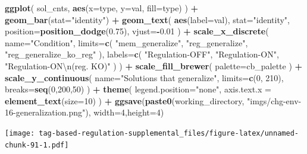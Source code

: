 \documentclass[]{book}
\newenvironment{Shaded}{\begin{snugshade}}{\end{snugshade}}
\newcommand{\CharTok}[1]{\textcolor[rgb]{0.31,0.60,0.02}{#1}}
\newcommand{\DataTypeTok}[1]{\textcolor[rgb]{0.13,0.29,0.53}{#1}}
\newcommand{\DecValTok}[1]{\textcolor[rgb]{0.00,0.00,0.81}{#1}}
\newcommand{\FloatTok}[1]{\textcolor[rgb]{0.00,0.00,0.81}{#1}}
\newcommand{\KeywordTok}[1]{\textcolor[rgb]{0.13,0.29,0.53}{\textbf{#1}}}
\newcommand{\NormalTok}[1]{#1}
\newcommand{\OperatorTok}[1]{\textcolor[rgb]{0.81,0.36,0.00}{\textbf{#1}}}
\newcommand{\StringTok}[1]{\textcolor[rgb]{0.31,0.60,0.02}{#1}}
\begin{document}
\begin{Shaded}
\begin{Highlighting}[]
\KeywordTok{ggplot}\NormalTok{( sol_cnts, }\KeywordTok{aes}\NormalTok{(}\DataTypeTok{x=}\NormalTok{type, }\DataTypeTok{y=}\NormalTok{val, }\DataTypeTok{fill=}\NormalTok{type) ) }\OperatorTok{+}
\StringTok{  }\KeywordTok{geom_bar}\NormalTok{(}\DataTypeTok{stat=}\StringTok{"identity"}\NormalTok{) }\OperatorTok{+}
\StringTok{  }\KeywordTok{geom_text}\NormalTok{(}
    \KeywordTok{aes}\NormalTok{(}\DataTypeTok{label=}\NormalTok{val),}
    \DataTypeTok{stat=}\StringTok{"identity"}\NormalTok{,}
    \DataTypeTok{position=}\KeywordTok{position_dodge}\NormalTok{(}\FloatTok{0.75}\NormalTok{),}
    \DataTypeTok{vjust=}\OperatorTok{-}\FloatTok{0.01}
\NormalTok{  ) }\OperatorTok{+}
\StringTok{  }\KeywordTok{scale_x_discrete}\NormalTok{(}
    \DataTypeTok{name=}\StringTok{"Condition"}\NormalTok{,}
    \DataTypeTok{limits=}\KeywordTok{c}\NormalTok{(}
      \StringTok{"mem_generalize"}\NormalTok{,}
      \StringTok{"reg_generalize"}\NormalTok{,}
      \StringTok{"reg_generalize_ko_reg"}
\NormalTok{      ),}
    \DataTypeTok{labels=}\KeywordTok{c}\NormalTok{(}
      \StringTok{"Regulation-OFF"}\NormalTok{,}
      \StringTok{"Regulation-ON"}\NormalTok{,}
      \StringTok{"Regulation-ON}\CharTok{\textbackslash{}n}\StringTok{(reg. KO)"}
\NormalTok{    )}
\NormalTok{  ) }\OperatorTok{+}
\StringTok{  }\KeywordTok{scale_fill_brewer}\NormalTok{(}
    \DataTypeTok{palette=}\NormalTok{cb_palette}
\NormalTok{  ) }\OperatorTok{+}
\StringTok{  }\KeywordTok{scale_y_continuous}\NormalTok{(}
    \DataTypeTok{name=}\StringTok{"Solutions that generalize"}\NormalTok{,}
    \DataTypeTok{limits=}\KeywordTok{c}\NormalTok{(}\DecValTok{0}\NormalTok{, }\DecValTok{210}\NormalTok{),}
    \DataTypeTok{breaks=}\KeywordTok{seq}\NormalTok{(}\DecValTok{0}\NormalTok{,}\DecValTok{200}\NormalTok{,}\DecValTok{50}\NormalTok{)}
\NormalTok{  ) }\OperatorTok{+}
\StringTok{  }\KeywordTok{theme}\NormalTok{(}
    \DataTypeTok{legend.position=}\StringTok{"none"}\NormalTok{,}
    \DataTypeTok{axis.text.x =} \KeywordTok{element_text}\NormalTok{(}\DataTypeTok{size=}\DecValTok{10}\NormalTok{)}
\NormalTok{  ) }\OperatorTok{+}
\StringTok{  }\KeywordTok{ggsave}\NormalTok{(}\KeywordTok{paste0}\NormalTok{(working_directory, }\StringTok{"imgs/chg-env-16-generalization.png"}\NormalTok{), }\DataTypeTok{width=}\DecValTok{4}\NormalTok{,}\DataTypeTok{height=}\DecValTok{4}\NormalTok{)}
\end{Highlighting}
\end{Shaded}

\texttt{[image: tag-based-regulation-supplemental\_files/figure-latex/unnamed-chunk-91-1.pdf]}
\end{document}
